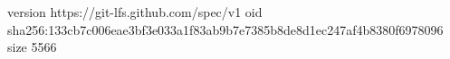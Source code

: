 version https://git-lfs.github.com/spec/v1
oid sha256:133cb7c006eae3bf3e033a1f83ab9b7e7385b8de8d1ec247af4b8380f6978096
size 5566
